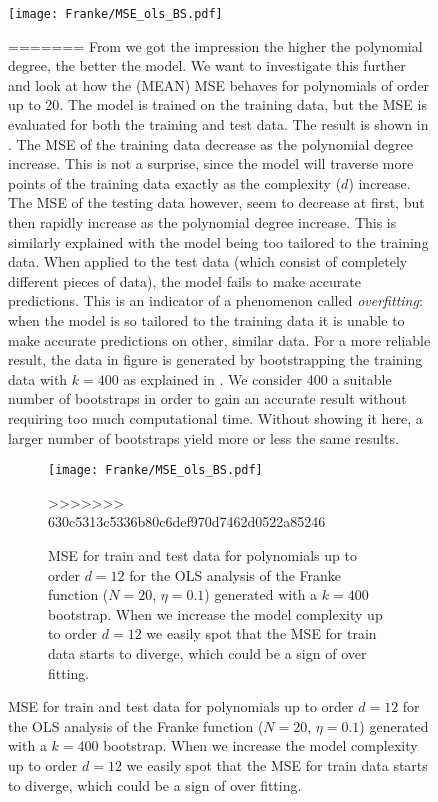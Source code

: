             \begin{figure}
                \texttt{[image: Franke/MSE\_ols\_BS.pdf]}
                \caption{MSE for train and test data for polynomials up to order $d=12$ for the OLS analysis of the Franke function ($N=20$, $\eta=0.1$) generated with a $k=400$ bootstrap. When we increase the model complexity  up to order $d=12$ we easily  spot that the MSE for train data starts to diverge, which could be a sign of over-fitting.}
=======
            From  we got the impression the higher the polynomial degree, the better the model. We want to investigate this further and look at how the (MEAN) MSE behaves for polynomials of order up to 20. The model is trained on the training data, but the MSE is evaluated for both the training and test data. The result is shown in . The MSE of the training data decrease as the polynomial degree increase. This is not a surprise, since the model will traverse more points of the training data exactly as the complexity ($d$) increase. The MSE of the testing data however, seem to decrease at first, but then rapidly increase as the polynomial degree increase. This is similarly explained with the model being too tailored to the training data. When applied to the test data (which consist of completely different pieces of data), the model fails to make accurate predictions. This is an indicator of a phenomenon called \textit{overfitting}: when the model is so tailored to the training data it is unable to make accurate predictions on other, similar data. For a more reliable result, the data in figure  is generated by bootstrapping the training data with $k=400$ as explained in . We consider 400 a suitable number of bootstraps in order to gain an accurate result without requiring too much computational time. Without showing it here, a larger number of bootstraps yield more or less the same results.

            \begin{figure}
                \texttt{[image: Franke/MSE\_ols\_BS.pdf]}
                \caption{MSE for train and test data for polynomials up to order $d=12$ for the OLS analysis of the Franke function ($N=20$, $\eta=0.1$) generated with a $k=400$ bootstrap. When we increase the model complexity  up to order $d=12$ we easily  spot that the MSE for train data starts to diverge, which could be a sign of over fitting.}
>>>>>>> 630c5313c5336b80c6def970d7462d0522a85246
                \label{fig:model_complexity_ols}
            \end{figure}


\end{figure}
